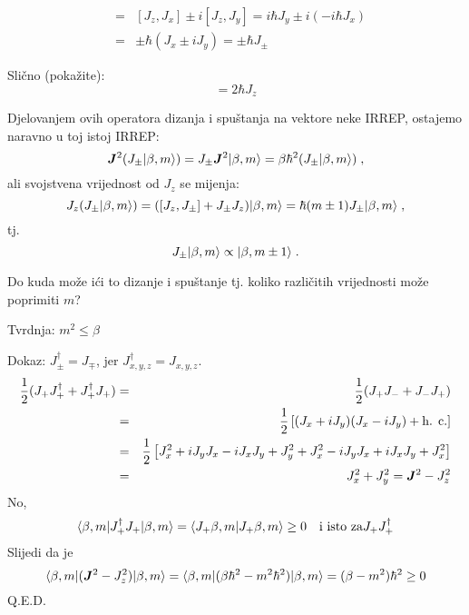 \begin{eqnarray*}
 [J_z, J_\pm]& = & [J_z, J_x] \pm i [J_z, J_y] = i\hbar J_y \pm i (-i\hbar J_x)
 \\ & = & \pm \hbar (J_x \pm i J_y) = \pm \hbar J_\pm
\end{eqnarray*}

Slično (pokažite):
\begin{displaymath}
 [J_+, J_-] = 2 \hbar J_z
\end{displaymath}

 Djelovanjem ovih operatora dizanja i spuštanja na vektore neke IRREP,
ostajemo naravno u toj istoj IRREP:
\begin{displaymath}
   \jsq(J_{\pm}\ket{\beta, m})=J_{\pm}\jsq\ket{\beta, m}=\beta\hbar^2
    (J_{\pm}\ket{\beta, m}) \;,
\end{displaymath}
ali svojstvena vrijednost od $J_z$ se mijenja:
\begin{equation}
J_z(J_{\pm}| \beta, m \rangle)=([J_z,J_{\pm}]+J_{\pm}J_z)| \beta, m \rangle=
\hbar(m\pm 1)J_{\pm}| \beta, m \rangle \;,
\label{jzjpm}
\end{equation}
tj.
\begin{displaymath}
    J_{\pm}| \beta, m \rangle\propto | \beta, m\pm 1 \rangle \;.
\end{displaymath}


Do kuda  može ići to dizanje i spuštanje tj. koliko različitih vrijednosti
može poprimiti $m$?

Tvrdnja: $m^2 \leq \beta$

Dokaz: $J_{\pm}^{\dagger}=J_{\mp}$, jer $J^{\dagger}_{x,y,z}=J_{x,y,z}$.
\begin{eqnarray*}
 \frac{1}{2}(J_+ J_{+}^{\dagger} + J_{+}^{\dagger}J_+)& = &
 \frac{1}{2}(J_+ J_{-}+ J_- J_+) \\
& = & \frac{1}{2} \left[ (J_x + i J_y)(J_x - i J_y) + \textrm{h. c.} \right]
\\ & = & \frac{1}{2} \left[ J_{x}^2 + i J_y J_x - i J_x J_y + J_{y}^2
  + J_{x}^2 - i J_y J_x + i J_x J_y + J_{x}^2 \right] \\
& = & J_{x}^2 + J_{y}^2 = \jsq - J_{z}^2
\end{eqnarray*}
No,
\begin{displaymath}
\langle \beta, m |J_{+}^{\dagger}J_+ | \beta, m \rangle =
\langle J_{+}\beta, m |J_{+}\beta, m\rangle  \geq 0 \quad \textrm{i isto za}
J_+ J_{+}^{\dagger}
\end{displaymath}
Slijedi da je
\begin{displaymath}
\bra{\beta, m}(\jsq - J_{z}^2)\ket{\beta, m}=
\bra{\beta, m}(\beta\hbar^2 - m^2\hbar^2)\ket{\beta, m} =
(\beta - m^2)\hbar^2 \geq 0
\end{displaymath}
Q.E.D.

